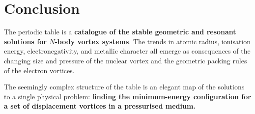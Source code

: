 \section{Conclusion}

The periodic table is a \textbf{catalogue of the stable geometric and resonant solutions for $N$-body vortex systems}.  The trends in atomic radius, ionisation energy, electronegativity, and metallic character all emerge as consequences of the changing size and pressure of the nuclear vortex and the geometric packing rules of the electron vortices.

The seemingly complex structure of the table is an elegant map of the solutions to a single physical problem: \textbf{finding the minimum-energy configuration for a set of displacement vortices in a pressurised medium.}
